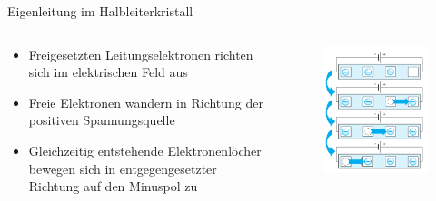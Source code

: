 \documentclass[12pt%
,aspectratio=169%
]{beamer}
\begin{document}
\begin{frame}{Eigenleitung im Halbleiterkristall}
\begin{columns}[T] %
\begin{column}{.48\textwidth}
\begin{itemize}
	\item Freigesetzten Leitungselektronen richten sich im elektrischen Feld aus
	\item Freie Elektronen wandern in Richtung der positiven Spannungsquelle
	\item Gleichzeitig entstehende Elektronenlöcher bewegen sich in entgegengesetzter Richtung auf den Minuspol zu
\end{itemize}
\end{column}%
\hfill%
\begin{column}{.48\textwidth}
\vspace*{-0.3cm}
\begin{figure}
\center
\includegraphics[scale=.4]{pictures/eigenleitung}
\end{figure}
\end{column}%
\end{columns}
\end{frame}
\end{document}
